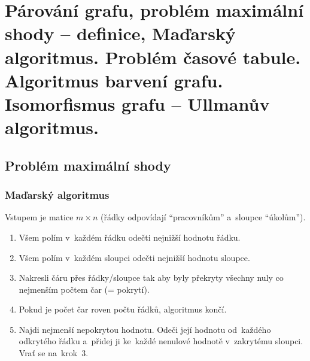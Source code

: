 \clearpage
\section{Párování grafu, problém maximální shody -- definice, Maďarský algoritmus. Problém časové tabule. Algoritmus barvení grafu. Isomorfismus grafu -- Ullmanův algoritmus.}

% 

% 
% 

\subsection{Problém maximální shody}

\subsubsection{Maďarský algoritmus}

Vstupem je matice $m \times n$ (řádky odpovídají \enquote{pracovníkům} a~sloupce \enquote{úkolům}).

\begin{enumerate}
    \item Všem polím v~každém řádku odečti nejnižší hodnotu řádku.
    \item Všem polím v~každém sloupci odečti nejnižší hodnotu sloupce.
    \item Nakresli čáru přes řádky/sloupce tak aby byly překryty všechny nuly co nejmenším počtem čar (= pokrytí).
    \item Pokud je počet čar roven počtu řádků, algoritmus končí.
    \item Najdi nejmenší nepokrytou hodnotu. Odeči její hodnotu od~každého odkrytého řádku a~přidej ji ke~každé nenulové hodnotě v~zakrytému sloupci. Vrať se na~krok~3.
\end{enumerate}

